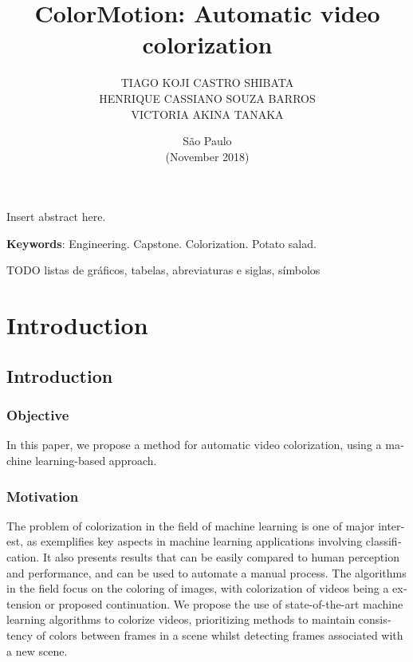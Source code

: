 \documentclass[12pt,openright,twoside,a4paper,english]{abntex2}
\author{TIAGO KOJI CASTRO SHIBATA\\
HENRIQUE CASSIANO SOUZA BARROS\\
VICTORIA AKINA TANAKA}
\title{ColorMotion: Automatic video colorization}
\date{São Paulo\\(November 2018)}
\begin{document}
\begin{otherlanguage}{english}

\imprimircapa
\imprimirfalsafolhaderosto
\imprimirfolhaderosto

\begin{resumo}
Insert abstract here.
\vspace{\onelineskip}

\noindent
\textbf{Keywords}: Engineering. Capstone. Colorization. Potato salad.
\end{resumo}

TODO listas de gráficos, tabelas, abreviaturas e siglas, símbolos

\tableofcontents

\maketitle

\chapter{Introduction}
\section{Introduction}

\subsection{Objective}
In this paper, we propose a method for automatic video colorization, using a machine learning-based approach.

\subsection{Motivation} \label{sec:Motivation}
The problem of colorization in the field of machine learning is one of major interest, as exemplifies key aspects in machine learning applications involving classification. It also presents results that can be easily compared to human perception and performance, and can be used to automate a manual process. The algorithms in the field focus on the coloring of images, with colorization of videos being a extension or proposed continuation. We propose the use of state-of-the-art machine learning algorithms to colorize videos, prioritizing methods to maintain consistency of colors between frames in a scene whilst detecting frames associated with a new scene.


\end{otherlanguage}
\end{document}

